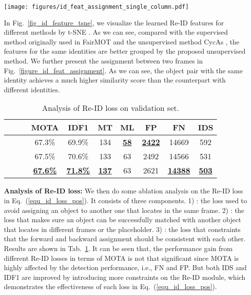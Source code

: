 \documentclass[final,1p,times,twocolumn]{elsarticle}
\newcommand{\tref}[1]{Tab.~\ref{#1}}
\newcommand{\eref}[1]{Eq.~(\ref{#1})}
\newcommand{\fref}[1]{Fig.~\ref{#1}}
\begin{document}
	
	\begin{figure*}\centering
		\texttt{[image: figures/id\_feat\_assignment\_single\_column.pdf]}
		\caption{
			Illustration of assignment between two frames. Left and right are the detection results, in which the color of boxes and the numbers attached to the boxes indicate the identities. Middle is the assignment matrix .
		}
		\label{figure_id_feat_assignment}
	\end{figure*}
	
	
	
	
	In \fref{fig_id_feature_tsne}, we visualize the learned Re-ID features for different methods by t-SNE \cite{maaten2008visualizing}. As we can see, compared with the supervised method originally used in FairMOT \cite{zhang2020fairmot} and the unsupervised method CycAs \cite{wang2020cycas}, the features for the same identities are better grouped by the proposed unsupervised method. We further present the assignment between two frames in \fref{figure_id_feat_assignment}. As we can see, the object pair with the same identity achieves a much higher similarity score than the counterpart with different identities. 
	
	
	\begin{table}
		\caption{Analysis of Re-ID loss on validation set. 
		}
		\setlength{\tabcolsep}{2pt}
		\centering
\scriptsize
		\begin{tabular}{ccc|c|c|c|c|c|c|c}
			\hline
			 & &  &MOTA &IDF1  &MT &ML &FP &FN  &IDS \\
			\hline
			\checkmark & & &67.3\% &69.9\% &134 &\underline{\bf58} &\underline{\bf2422} &14669 &592 \\
			\checkmark &\checkmark & &67.5\% &70.6\% &133 &63 &2492 &14566 &531 \\
			\checkmark &\checkmark &\checkmark &\underline{\bf67.6\%} &\underline{\bf71.8\%} &\underline{\bf137} &63 &2621 &\underline{\bf14388} &\underline{\bf503}  \\
			\hline
		\end{tabular}
		\label{table_analysis_of_reid_loss}
	\end{table}	
	

	
	\textbf{Analysis of Re-ID loss:} We then do some ablation analysis on the Re-ID loss  in \eref{equ_id_loss_pos}. It consists of three components. 1) : the loss used to avoid assigning an object to another one that locates in the same frame. 2) : the loss that makes sure an object can be successfully matched with another object that locates in different frames or the placeholder. 3) : the loss that constraints that the forward and backward assignment should be consistent with each other. Results are shown in \tref{table_analysis_of_reid_loss}. It can be seen that, the performance gain from different Re-ID losses in terms of MOTA is not that significant since MOTA is highly affected by the detection performance, i.e., FN and FP. But both IDS and IDF1 are improved by introducing more constraints on the Re-ID module, which demonstrates the effectiveness of each loss in \eref{equ_id_loss_pos}. 
	
\end{document}
